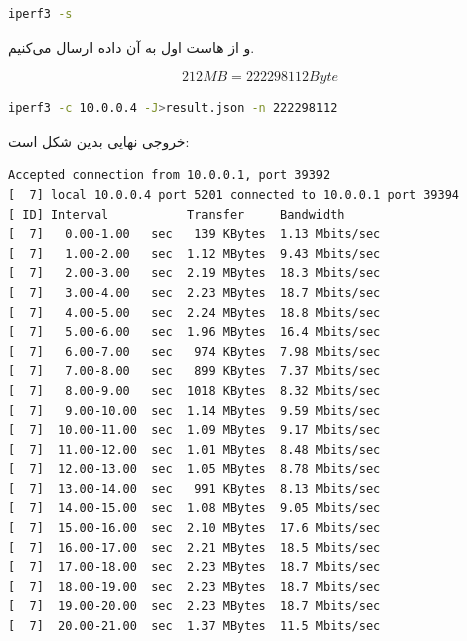 \documentclass[12pt]{article}
\begin{document}
\begin{enumerate}
\begin{latin}
	\begin{lstlisting}[language=bash]
		iperf3 -s
	\end{lstlisting}
\end{latin}

و از هاست اول به آن داده ارسال می‌کنیم.

$$212 MB = 222298112 Byte$$


\begin{latin}
	\begin{lstlisting}[language=bash]
		 iperf3 -c 10.0.0.4 -J>result.json -n 222298112 
	\end{lstlisting}
\end{latin}

خروجی نهایی بدین شکل است:

\begin{latin}
\begin{Verbatim}
Accepted connection from 10.0.0.1, port 39392
[  7] local 10.0.0.4 port 5201 connected to 10.0.0.1 port 39394
[ ID] Interval           Transfer     Bandwidth
[  7]   0.00-1.00   sec   139 KBytes  1.13 Mbits/sec                  
[  7]   1.00-2.00   sec  1.12 MBytes  9.43 Mbits/sec                  
[  7]   2.00-3.00   sec  2.19 MBytes  18.3 Mbits/sec                  
[  7]   3.00-4.00   sec  2.23 MBytes  18.7 Mbits/sec                  
[  7]   4.00-5.00   sec  2.24 MBytes  18.8 Mbits/sec                  
[  7]   5.00-6.00   sec  1.96 MBytes  16.4 Mbits/sec                  
[  7]   6.00-7.00   sec   974 KBytes  7.98 Mbits/sec                  
[  7]   7.00-8.00   sec   899 KBytes  7.37 Mbits/sec                  
[  7]   8.00-9.00   sec  1018 KBytes  8.32 Mbits/sec                  
[  7]   9.00-10.00  sec  1.14 MBytes  9.59 Mbits/sec                  
[  7]  10.00-11.00  sec  1.09 MBytes  9.17 Mbits/sec                  
[  7]  11.00-12.00  sec  1.01 MBytes  8.48 Mbits/sec                  
[  7]  12.00-13.00  sec  1.05 MBytes  8.78 Mbits/sec                  
[  7]  13.00-14.00  sec   991 KBytes  8.13 Mbits/sec                  
[  7]  14.00-15.00  sec  1.08 MBytes  9.05 Mbits/sec                  
[  7]  15.00-16.00  sec  2.10 MBytes  17.6 Mbits/sec                  
[  7]  16.00-17.00  sec  2.21 MBytes  18.5 Mbits/sec                  
[  7]  17.00-18.00  sec  2.23 MBytes  18.7 Mbits/sec                  
[  7]  18.00-19.00  sec  2.23 MBytes  18.7 Mbits/sec                  
[  7]  19.00-20.00  sec  2.23 MBytes  18.7 Mbits/sec                  
[  7]  20.00-21.00  sec  1.37 MBytes  11.5 Mbits/sec                  

\end{Verbatim}
\end{latin}
\end{enumerate}
\end{document}
